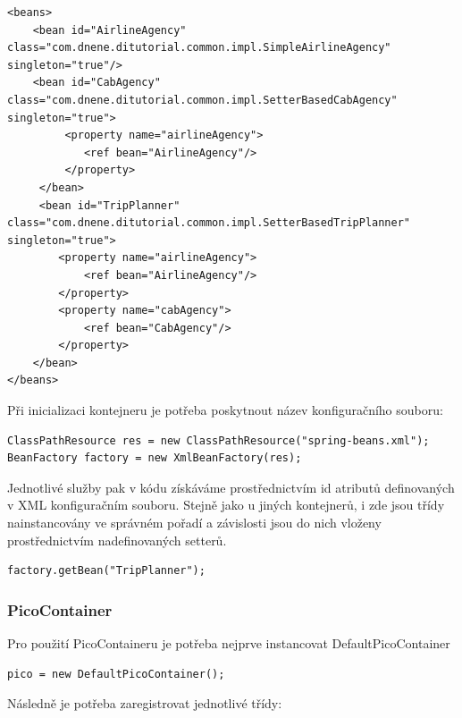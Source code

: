 \documentclass[a4paper,conference]{IEEEtran}
\begin{document}
\lstset{language=XML,caption=Konfigurační soubor Spring kontejneru,label=listing:XML}
\begin{lstlisting}
<beans>  
	<bean id="AirlineAgency" class="com.dnene.ditutorial.common.impl.SimpleAirlineAgency" singleton="true"/>  
	<bean id="CabAgency" class="com.dnene.ditutorial.common.impl.SetterBasedCabAgency" singleton="true">  
		 <property name="airlineAgency">	
	 		<ref bean="AirlineAgency"/>   
		 </property>  
	 </bean> 
	 <bean id="TripPlanner" class="com.dnene.ditutorial.common.impl.SetterBasedTripPlanner" singleton="true">   
	 	<property name="airlineAgency">	
			<ref bean="AirlineAgency"/>   
		</property>   
		<property name="cabAgency">	
			<ref bean="CabAgency"/>   
		</property>  
	</bean> 
</beans>
\end{lstlisting}

Při inicializaci kontejneru je potřeba poskytnout název konfiguračního souboru:

\lstset{language=Java,caption=Inicializace kontejneru,label=listing:Java}
\begin{lstlisting}
ClassPathResource res = new ClassPathResource("spring-beans.xml"); BeanFactory factory = new XmlBeanFactory(res);
\end{lstlisting}

Jednotlivé služby pak v kódu získáváme prostřednictvím id atributů definovaných v XML konfiguračním souboru. Stejně jako u jiných kontejnerů, i zde jsou třídy nainstancovány ve správném pořadí a závislosti jsou do nich vloženy prostřednictvím nadefinovaných setterů.

\lstset{language=Java,caption=Inicializace kontejneru,label=listing:Java}
\begin{lstlisting}
factory.getBean("TripPlanner");
\end{lstlisting}

\subsubsection{PicoContainer}

Pro použití PicoContaineru je potřeba nejprve instancovat  DefaultPicoContainer

\lstset{language=Java,caption=Inicializace kontejneru,label=listing:Java}
\begin{lstlisting}
pico = new DefaultPicoContainer();
\end{lstlisting}

Následně je potřeba zaregistrovat jednotlivé třídy:
\end{document}
